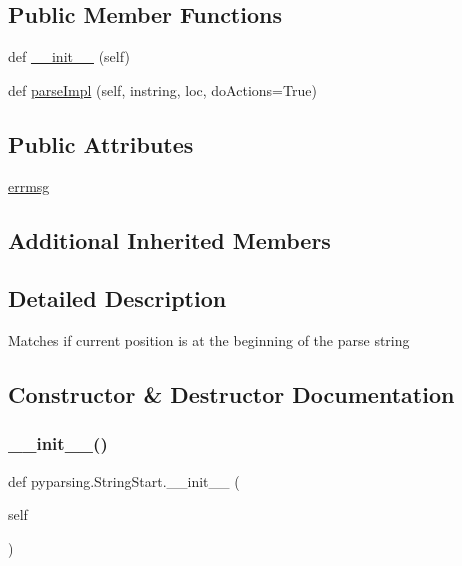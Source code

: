 \subsection*{Public Member Functions}
\begin{DoxyCompactItemize}
\item 
def \hyperlink{classpyparsing_1_1StringStart_ad013d2f2c6a14e547d780a2ff6f06cc3}{\+\_\+\+\_\+init\+\_\+\+\_\+} (self)
\item 
def \hyperlink{classpyparsing_1_1StringStart_aa40cdfe465bfd494a2eff55641cdc347}{parse\+Impl} (self, instring, loc, do\+Actions=True)
\end{DoxyCompactItemize}
\subsection*{Public Attributes}
\begin{DoxyCompactItemize}
\item 
\hyperlink{classpyparsing_1_1StringStart_a9c2e4863b415c0fb8d9b012e2a0f5178}{errmsg}
\end{DoxyCompactItemize}
\subsection*{Additional Inherited Members}


\subsection{Detailed Description}
\begin{DoxyVerb}Matches if current position is at the beginning of the parse
string
\end{DoxyVerb}
 

\subsection{Constructor \& Destructor Documentation}
\mbox{\label{classpyparsing_1_1StringStart_ad013d2f2c6a14e547d780a2ff6f06cc3}} 
\subsubsection{\texorpdfstring{\+\_\+\+\_\+init\+\_\+\+\_\+()}{\_\_init\_\_()}}
{\footnotesize\ttfamily def pyparsing.\+String\+Start.\+\_\+\+\_\+init\+\_\+\+\_\+ (\begin{DoxyParamCaption}\item[{}]{self }\end{DoxyParamCaption})}



